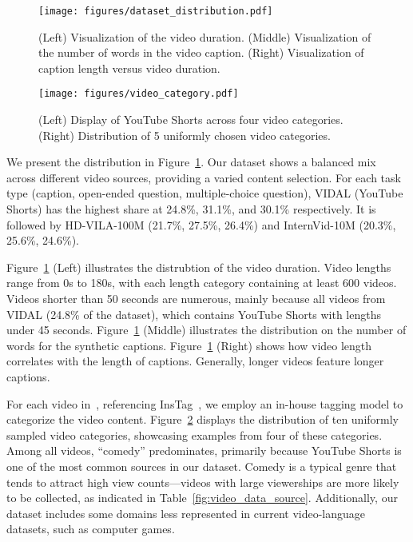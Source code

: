 \begin{figure}[t!]
\centering
\texttt{[image: figures/dataset\_distribution.pdf]}
\caption{ (Left) Visualization of the video duration. (Middle) Visualization of the number of words in the video caption. (Right) Visualization of caption length versus video duration.}
\label{fig:dataset_distribution}
\end{figure}
\begin{figure}[t!]
\centering
\texttt{[image: figures/video\_category.pdf]}
\caption{(Left) Display of YouTube Shorts across four video categories. (Right) Distribution of 5 uniformly chosen video categories. }
\label{fig:video_category}
\end{figure}

We present the distribution in Figure~\ref{fig:dataset_distribution}. Our dataset shows a balanced mix across different video sources, providing a varied content selection. For each task type (caption, open-ended question, multiple-choice question), VIDAL (YouTube Shorts) has the highest share at 24.8\%, 31.1\%, and 30.1\% respectively. It is followed by HD-VILA-100M (21.7\%, 27.5\%, 26.4\%) and InternVid-10M (20.3\%, 25.6\%, 24.6\%).

Figure~\ref{fig:dataset_distribution} (Left) illustrates the distrubtion of the video duration. Video lengths range from 0s to 180s, with each length category containing at least 600 videos. Videos shorter than 50 seconds are numerous, mainly because all videos from VIDAL (24.8\% of the dataset), which contains YouTube Shorts with lengths under 45 seconds. 
Figure~\ref{fig:dataset_distribution} (Middle) illustrates the distribution on the number of words for the synthetic captions.
Figure~\ref{fig:dataset_distribution} (Right) shows how video length correlates with the length of captions. Generally, longer videos feature longer captions.

For each video in~\DataName, referencing InsTag~\citep{lu2023instag}, we employ an in-house tagging model to categorize the video content. Figure~\ref{fig:video_category} displays the distribution of ten uniformly sampled video categories, showcasing examples from four of these categories. Among all videos, ``comedy'' predominates, primarily because YouTube Shorts is one of the most common sources in our dataset. Comedy is a typical genre that tends to attract high view counts—videos with large viewerships are more likely to be collected, as indicated in Table~\ref{fig:video_data_source}. Additionally, our dataset includes some domains less represented in current video-language datasets, such as computer games.

